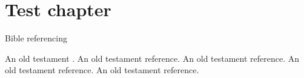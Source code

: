 \documentclass[twoside,14pt,onecolumn,openright ,a4paper]{memoir}
\begin{document}
        \chapter{Test chapter}
            \beginnumbering
            \pstart
            \lipsum[1]
         Bible referencing 
        \lipsum[1]
        \pend

            \pstart 
        \lipsum[1]


            An old testament  .
            An old testament reference.
            An old testament reference.
            An old testament reference.
            An old testament reference.
            \lipsum[1]
            \pend
            \endnumbering

            \backmatter
            \printindex[bible]
        
\end{document}
